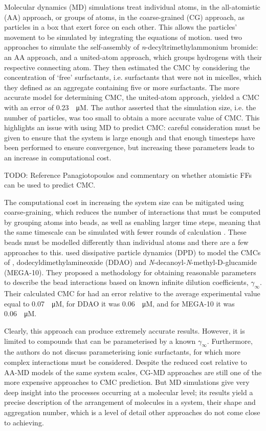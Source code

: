 Molecular dynamics (MD) simulations treat individual atoms, in the all-atomistic
(AA) approach, or groups of atoms, in the coarse-grained (CG) approach, as
particles in a box that exert force on each other. This allows the particles'
movement to be simulated by integrating the equations of motion.
\citet{jorgeMolecularDynamicsSimulation2008} used two approaches to simulate the
self-assembly of \textit{n}-decyltrimethylammonium bromide: an AA approach, and
a united-atom approach, which groups hydrogens with their respective connecting
atom. They then estimated the CMC by considering the concentration of `free'
surfactants, i.e. surfactants that were not in micelles, which they defined as
an aggregate containing five or more surfactants. The more accurate model for
determining CMC, the united-atom approach, yielded a CMC with an error of
\SI{0.23}{\log \micro M}. The author asserted that the simulation size, i.e. the
number of particles, was too small to obtain a more accurate value of CMC. This
highlights an issue with using MD to predict CMC: careful consideration must be
given to ensure that the system is large enough and that enough timesteps have
been performed to ensure convergence, but increasing these parameters leads to
an increase in computational cost.

TODO: Reference Panagiotopoulos and commentary on whether atomistic FFs can be used
to predict CMC.

The computational cost in increasing the system size can be mitigated using
coarse-graining, which reduces the number of interactions that must be computed
by grouping atoms into beads, as well as enabling larger time steps, meaning
that the same timescale can be simulated with fewer rounds of calculation
\cite{fitzgeraldMultiscaleModelingNanomaterials2015}. These beads must be
modelled differently than individual atoms and there are a few approaches to
this. \citet{vishnyakovPredictionCriticalMicelle2013} used dissipative particle
dynamics (DPD) to model the CMCs of , dodecyldimethylamineoxide (DDAO)
and \textit{N}-decanoyl-\textit{N}-methyl-\textsc{D}-glucamide (MEGA-10). They
proposed a methodology for obtaining reasonable parameters to describe the bead
interactions based on known infinite dilution coefficients, $\gamma_\infty$.
Their calculated CMC for  had an error relative to the average
experimental value equal to \SI{0.07}{\log \micro M}, for DDAO it was
\SI{0.06}{\log \micro M}, and for MEGA-10 it was \SI{0.06}{\log \micro M}.

Clearly, this approach can produce extremely accurate results. However, it is
limited to compounds that can be parameterised by a known $\gamma_\infty$.
Furthermore, the authors do not discuss parameterising ionic surfactants, for
which more complex interactions must be considered. Despite the reduced cost
relative to AA-MD models of the same system scales, CG-MD approaches are still
one of the more expensive approaches to CMC prediction. But MD simulations give
very deep insight into the processes occurring at a molecular level; its results
yield a precise description of the arrangement of molecules in a system, their
shape and aggregation number, which is a level of detail other approaches do not
come close to achieving.


